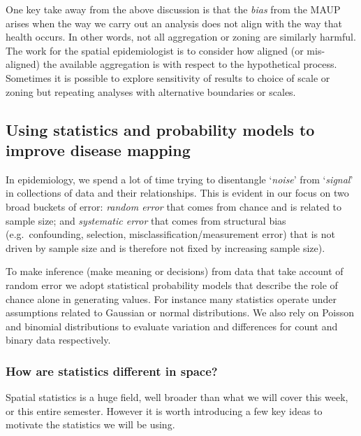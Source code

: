 \documentclass[
]{book}
\begin{document}
One key take away from the above discussion is that the \emph{bias} from the MAUP arises when the way we carry out an analysis does not align with the way that health occurs. In other words, not all aggregation or zoning are similarly harmful. The work for the spatial epidemiologist is to consider how aligned (or mis-aligned) the available aggregation is with respect to the hypothetical process. Sometimes it is possible to explore sensitivity of results to choice of scale or zoning but repeating analyses with alternative boundaries or scales.

\hypertarget{using-statistics-and-probability-models-to-improve-disease-mapping}{%
\subsection{Using statistics and probability models to improve disease mapping}\label{using-statistics-and-probability-models-to-improve-disease-mapping}}

In epidemiology, we spend a lot of time trying to disentangle `\emph{noise}' from `\emph{signal}' in collections of data and their relationships. This is evident in our focus on two broad buckets of error: \emph{random error} that comes from chance and is related to sample size; and \emph{systematic error} that comes from structural bias (e.g.~confounding, selection, misclassification/measurement error) that is not driven by sample size and is therefore not fixed by increasing sample size).

To make inference (make meaning or decisions) from data that take account of random error we adopt statistical probability models that describe the role of chance alone in generating values. For instance many statistics operate under assumptions related to Gaussian or normal distributions. We also rely on Poisson and binomial distributions to evaluate variation and differences for count and binary data respectively.

\hypertarget{how-are-statistics-different-in-space}{%
\subsubsection{How are statistics different in space?}\label{how-are-statistics-different-in-space}}

Spatial statistics is a huge field, well broader than what we will cover this week, or this entire semester. However it is worth introducing a few key ideas to motivate the statistics we will be using.
\end{document}
